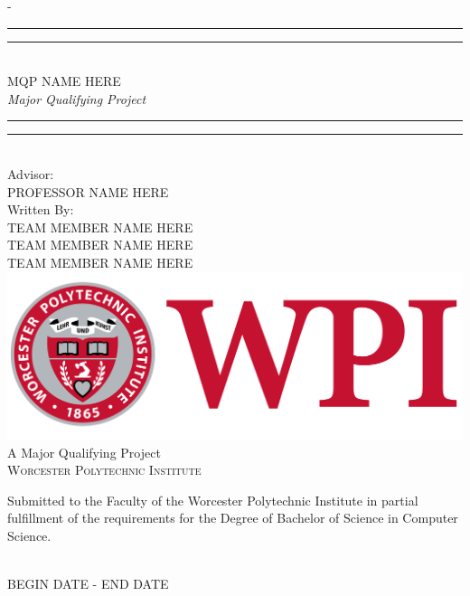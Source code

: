 \begin{titlingpage}
\begin{SingleSpace}
\calccentering{\unitlength} 
\begin{adjustwidth*}{\unitlength}{-\unitlength}
\vspace*{9mm}
\begin{center}
\rule[0.5ex]{\linewidth}{2pt}\vspace*{-\baselineskip}\vspace*{3.2pt}
\rule[0.5ex]{\linewidth}{1pt}\\[\baselineskip]
{\HUGE MQP NAME HERE}\\[4mm]
{\Large \textit{Major Qualifying Project}}\\
\rule[0.5ex]{\linewidth}{1pt}\vspace*{-\baselineskip}\vspace{3.2pt}
\rule[0.5ex]{\linewidth}{2pt}\\
\vspace{6.5mm}
{\large Advisor:}\\
\vspace{6.5mm}
{\large\textsc{PROFESSOR NAME HERE}}\\
\vspace{6.5mm}
{\large Written By:}\\
\vspace{6.5mm}
{\large\textsc{TEAM MEMBER NAME HERE}}\\
{\large\textsc{TEAM MEMBER NAME HERE}}\\
{\large\textsc{TEAM MEMBER NAME HERE}}\\
\vspace{11mm}
\includegraphics[scale=0.075]{img/newwpilogo.png}\\
\vspace{6mm}
{\large A Major Qualifying Project\\
\textsc{Worcester Polytechnic Institute}}\\
\vspace{11mm}
\begin{minipage}{10cm}
\centering
Submitted to the Faculty of the Worcester Polytechnic Institute in partial fulfillment of the requirements for the Degree of Bachelor of Science in Computer Science.
\end{minipage}\\
\vspace{9mm}
{\large\textsc{BEGIN DATE - END DATE}}
\vspace{12mm}
\end{center}
\begin{flushright}
\end{flushright}
\end{adjustwidth*}
\end{SingleSpace}
\end{titlingpage}
